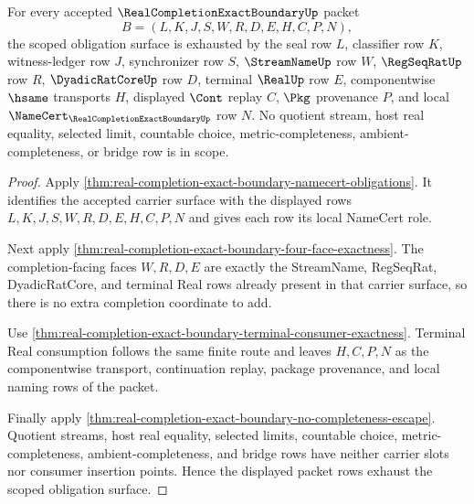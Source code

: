 \begin{theorem}
\label{thm:real-completion-exact-boundary-scoped-obligation-closure}
For every accepted $\RealCompletionExactBoundaryUp$ packet
$$
B=(L,K,J,S,W,R,D,E,H,C,P,N),
$$
the scoped obligation surface is exhausted by the seal row $L$, classifier row $K$, witness-ledger row $J$, synchronizer row $S$, $\StreamNameUp$ row $W$, $\RegSeqRatUp$ row $R$, $\DyadicRatCoreUp$ row $D$, terminal $\RealUp$ row $E$, componentwise $\hsame$ transports $H$, displayed $\Cont$ replay $C$, $\Pkg$ provenance $P$, and local $\NameCert_{\RealCompletionExactBoundaryUp}$ row $N$. No quotient stream, host real equality, selected limit, countable choice, metric-completeness, ambient-completeness, or bridge row is in scope.
\end{theorem}
\begin{proof}
Apply \autoref{thm:real-completion-exact-boundary-namecert-obligations}. It identifies the accepted carrier surface with the displayed rows $L,K,J,S,W,R,D,E,H,C,P,N$ and gives each row its local NameCert role.

Next apply \autoref{thm:real-completion-exact-boundary-four-face-exactness}. The completion-facing faces $W,R,D,E$ are exactly the StreamName, RegSeqRat, DyadicRatCore, and terminal Real rows already present in that carrier surface, so there is no extra completion coordinate to add.

Use \autoref{thm:real-completion-exact-boundary-terminal-consumer-exactness}. Terminal Real consumption follows the same finite route and leaves $H,C,P,N$ as the componentwise transport, continuation replay, package provenance, and local naming rows of the packet.

Finally apply \autoref{thm:real-completion-exact-boundary-no-completeness-escape}. Quotient streams, host real equality, selected limits, countable choice, metric-completeness, ambient-completeness, and bridge rows have neither carrier slots nor consumer insertion points. Hence the displayed packet rows exhaust the scoped obligation surface.
\end{proof}

